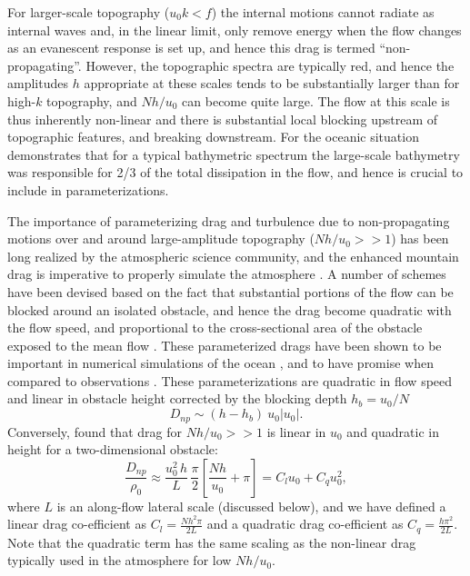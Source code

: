 \documentclass[twocol]{ametsocV5}
\begin{document}
For larger-scale topography ($u_0k<f$) the internal motions cannot radiate as internal waves and, in the linear limit, only remove energy when the flow changes as an evanescent response is set up, and hence this drag is termed ``non-propagating''.  However, the topographic spectra are typically red, and hence the amplitudes $h$ appropriate at these scales tends to be substantially larger than for high-$k$ topography, and $Nh/u_0$ can become quite large.  The flow at this scale is thus inherently non-linear and there is substantial local blocking upstream of topographic features, and breaking downstream. For the oceanic situation \citet{klymak18} demonstrates that for a typical bathymetric spectrum  \citep[i.e.\ the ones used by][]{nikurashinferrari14} the large-scale bathymetry was responsible for 2/3 of the total dissipation in the flow, and hence is crucial to include in parameterizations.  

The importance of parameterizing drag and turbulence due to non-propagating motions over and around large-amplitude topography ($Nh/u_0 >> 1$) has been long realized by the atmospheric science community, and the enhanced mountain drag is imperative to properly simulate the atmosphere \citep[i.e.][]{bacmeisterpierrhumbert88,LottMiller97}.  A number of schemes have been devised based on the fact that substantial portions of the flow can be blocked around an isolated obstacle, and hence the drag become quadratic with the flow speed, and proportional to the cross-sectional area of the obstacle exposed to the mean flow \citep[i.e.][]{ScinoccaMcFarlane00, Garner05}.  These parameterized drags have been shown to be important in numerical simulations of the ocean \citep{trossmanetal13,trossmanetal2016}, and to have promise when compared to observations \citep{TrossmanEtAl15}.  These parameterizations are quadratic in flow speed and linear in obstacle height corrected by the blocking depth $h_b = u_0/N$
\begin{equation}
    D_{np} \sim (h-h_b)\ u_0 \left|u_0\right|.
\end{equation}
Conversely, \citep{klymaketal10a} found that drag for $Nh/u_0 >> 1$ is linear in $u_0$ and quadratic in height for a two-dimensional obstacle:  
\begin{equation}
    \frac{D_{np}}{\rho_0} \approx \frac{u_0^2\, h}{L}\, \frac{\pi}{2}\left[\frac{N h}{u_0}+ \pi\right] = C_l u_0 + C_q u_0^2,
    \label{eq:FormDragParam}
\end{equation}
where $L$ is an along-flow lateral scale (discussed below), and we have defined a linear drag co-efficient as $C_l = \frac{N h^2\pi}{2L}$ and a quadratic drag co-efficient as $C_q = \frac{h\pi^2}{2L}$.  Note that the quadratic  term has the same scaling as the non-linear drag typically used in the atmosphere for low $Nh/u_0$.  
\end{document}
